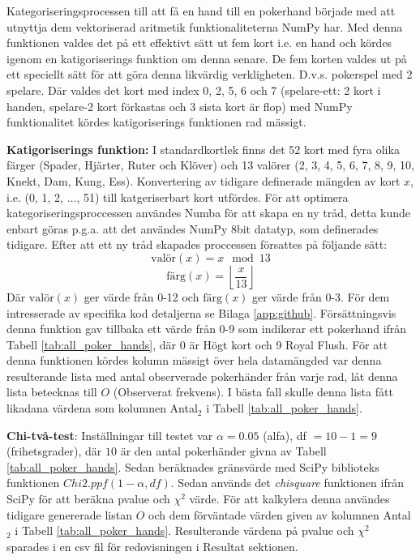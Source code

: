 \documentclass[swedish,a4paper]{article}
\begin{document}
\noindent
Kategoriseringsprocessen till att få en hand till en pokerhand började med
att utnyttja dem vektoriserad aritmetik funktionaliteterna NumPy har. Med denna 
funktionen valdes det på ett effektivt sätt ut fem kort i.e. en hand och kördes igenom
en katigoriserings funktion om denna senare. De fem korten valdes ut på ett
speciellt sätt för att göra denna likvärdig verkligheten. D.v.s. pokerspel med 2
spelare. Där valdes det kort med index 0, 2, 5, 6 och 7 (spelare-ett:  2 kort i
handen, spelare-2 kort förkastas och 3 sista kort är flop) med NumPy funktionalitet
kördes katigoriserings funktionen rad mässigt.

\textbf{Katigoriserings funktion:}
I standardkortlek finns det 52 kort med fyra olika 
färger (Spader, Hjärter, Ruter och Klöver) och 13 valörer 
(2, 3, 4, 5, 6, 7, 8, 9, 10, Knekt, Dam, Kung, Ess). Konvertering av tidigare
definerade mängden av kort $x$, i.e. (0, 1, 2, $\dots$, 51) till katgeriserbart
kort utfördes. För att optimera kategoriseringsproccessen användes Numba för att skapa en
ny tråd, detta kunde enbart göras p.g.a. att det användes NumPy 8bit datatyp, som definerades tidigare. Efter att ett ny tråd skapades proccessen
försattes på följande sätt: 
\begin{equation}
    \text{valör}(x) = x \mod 13
\end{equation}
\begin{equation}
    \text{färg}(x) = \left\lfloor \frac{x}{13} \right\rfloor
\end{equation}
Där $\text{valör}(x)$ ger värde från 0-12 och $\text{färg}(x)$ ger värde från
0-3. För dem intresserade av specifika kod detaljerna se Bilaga
\ref{app:github}. Försättningsvis denna funktion gav tillbaka ett värde från
0-9 som indikerar ett pokerhand ifrån Tabell \ref{tab:all_poker_hands}, där 0 är
Högt kort och 9 Royal Flush. För att denna funktionen kördes kolumn mässigt över
hela datamängded var denna resulterande 
lista med antal observerade pokerhänder från varje rad, låt denna lista betecknas till
$O$ (Observerat frekvens). I bästa fall skulle denna lista
fått likadana värdena som kolumnen Antal$_2$ i Tabell \ref{tab:all_poker_hands}.


\textbf{Chi-två-test}: Inställningar till testet var $\alpha = 0.05$
(\gls{alfa}), df $= 10 -
1 = 9$ (frihetsgrader), där $10$ är den antal pokerhänder givna av Tabell
\ref{tab:all_poker_hands}. Sedan beräknades gränsvärde med SciPy \gls{bibliotek}s
funktionen $Chi2.ppf( 1 - \alpha, df)$. Sedan används det \textit{chisquare}
funktionen ifrån SciPy för att beräkna \gls{pvalue} och $\chi^2$ värde. För att
kalkylera denna användes tidigare genererade listan $O$ och dem förväntade värden given av
kolumnen Antal$_2$ i Tabell \ref{tab:all_poker_hands}. Resulterande värdena på
\gls{pvalue} och $\chi^2$ sparades i en csv fil för redovisningen i Resultat
sektionen.
\end{document}
